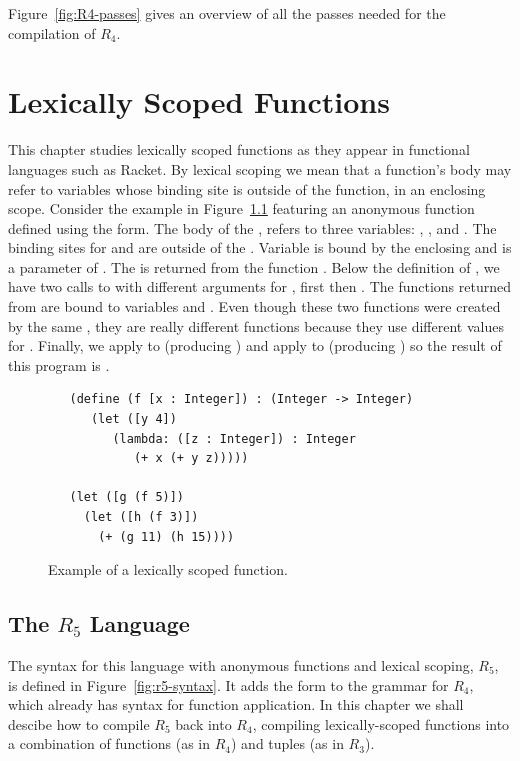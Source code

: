 \documentclass[11pt]{book}
\begin{document}
Figure~\ref{fig:R4-passes} gives an overview of all the passes needed
for the compilation of $R_4$.

\chapter{Lexically Scoped Functions}
\label{ch:lambdas}

This chapter studies lexically scoped functions as they appear in
functional languages such as Racket. By lexical scoping we mean that a
function's body may refer to variables whose binding site is outside
of the function, in an enclosing scope.
%
Consider the example in Figure~\ref{fig:lexical-scoping} featuring an
anonymous function defined using the  form.  The body of
the , refers to three variables: , , and
. The binding sites for  and  are outside of
the . Variable  is bound by the enclosing
 and  is a parameter of . The  is
returned from the function . Below the definition of ,
we have two calls to  with different arguments for ,
first  then . The functions returned from  are
bound to variables  and . Even though these two
functions were created by the same , they are really
different functions because they use different values for
. Finally, we apply  to  (producing
) and apply  to  (producing ) so
the result of this program is .

\begin{figure}[btp]
\begin{lstlisting}
   (define (f [x : Integer]) : (Integer -> Integer)
      (let ([y 4])
         (lambda: ([z : Integer]) : Integer
            (+ x (+ y z)))))

   (let ([g (f 5)])
     (let ([h (f 3)])
       (+ (g 11) (h 15))))
\end{lstlisting}
\caption{Example of a lexically scoped function.}
\label{fig:lexical-scoping}
\end{figure}


\section{The $R_5$ Language}

The syntax for this language with anonymous functions and lexical
scoping, $R_5$, is defined in Figure~\ref{fig:r5-syntax}. It adds the
 form to the grammar for $R_4$, which already has syntax
for function application.  In this chapter we shall descibe how to
compile $R_5$ back into $R_4$, compiling lexically-scoped functions
into a combination of functions (as in $R_4$) and tuples (as in
$R_3$).
\end{document}
